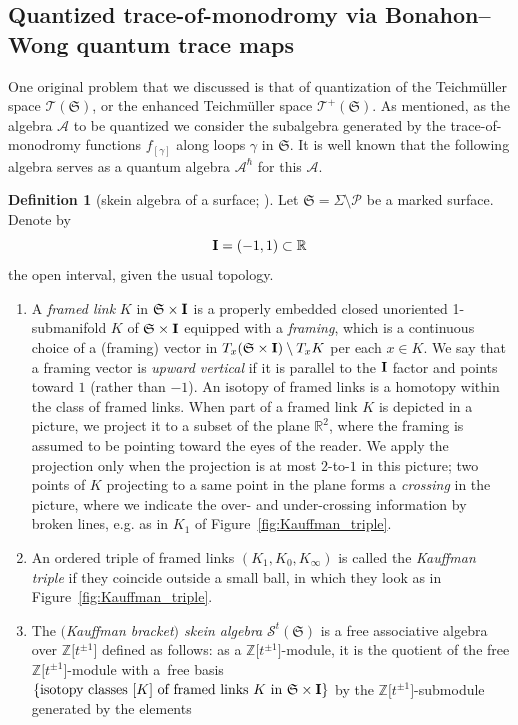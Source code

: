 \documentclass[10pt,a4paper]{amsart}
\numberwithin{equation}{section}
\theoremstyle{definition}
\newtheorem{Definition}[Theorem]{Definition}
\begin{document}
\subsection{Quantized trace-of-monodromy via Bonahon--Wong quantum trace maps}
\label{subsec:quantized_trace-of-monodromy}
One original problem that we discussed is that of quantization of the Teichm\"uller space $\mathscr{T}(\mathfrak{S})$, or the enhanced Teichm\"uller space $\mathscr{T}^+(\mathfrak{S})$. As mentioned, as the algebra $\mathcal{A}$ to be quantized we consider the subalgebra generated by the trace-of-monodromy functions $f_{[\gamma]}$ along loops $\gamma$ in $\mathfrak{S}$. It is well known that the following algebra serves as a quantum algebra $\mathcal{A}^\hbar$ for this $\mathcal{A}$.
\begin{Definition}[skein algebra of a surface; \cite{Pr, Turaev}]
\label{def:skein_algebra}
Let $\mathfrak{S} = \Sigma \setminus \mathcal{P}$ be a marked surface. Denote by
\[
{\bf I} = (-1,1) \subset \mathbb{R}
\]
the open interval, given the usual topology.
\begin{enumerate}[label={\rm (SA\arabic*)}]\itemsep=0pt \setlength{\leftskip}{0.22cm}
\item A {\em framed link} $K$ in $\mathfrak{S} \times {\bf I}$ is a properly embedded closed unoriented 1-submanifold $K$ of $\mathfrak{S}\times {\bf I}$ equipped with a {\em framing}, which is a continuous choice of a (framing) vector in $T_x(\mathfrak{S} \times {\bf I}) \setminus T_x K$ per each $x\in K$. We say that a framing vector is {\em upward vertical} if it is parallel to the ${\bf I}$ factor and points toward $1$ (rather than $-1$). An isotopy of framed links is a homotopy within the class of framed links.
When part of a framed link $K$ is depicted in a picture, we project it to a subset of the plane $\mathbb{R}^2$, where the framing is assumed to be pointing toward the eyes of the reader. We apply the projection only when the projection is at most $2$-to-$1$ in this picture; two points of $K$ projecting to a same point in the plane forms a {\em crossing} in the picture, where we indicate the over- and under-crossing information by broken lines, e.g. as in $K_1$ of Figure~\ref{fig:Kauffman_triple}.
\item An ordered triple of framed links $(K_1,K_0,K_\infty)$ is called the {\em Kauffman triple} if they coincide outside a small ball, in which they look as in Figure~\ref{fig:Kauffman_triple}.
\item The {\em $($Kauffman bracket$)$ skein algebra} $\mathcal{S}^t(\mathfrak{S})$ is a free associative algebra over $\mathbb{Z}\bigl[t^{\pm 1}\bigr]$ defined as follows: as a $\mathbb{Z}\bigl[t^{\pm 1}\bigr]$-module, it is the quotient of the free $\mathbb{Z}\bigl[t^{\pm 1}\bigr]$-module with a~free basis $\{\mbox{isotopy classes $[K]$ of framed links $K$ in $\mathfrak{S} \times {\bf I}$}\}$ by the $\mathbb{Z}\bigl[t^{\pm 1}\bigr]$-submodule generated by the elements

\end{enumerate}
\end{Definition}
\end{document}
